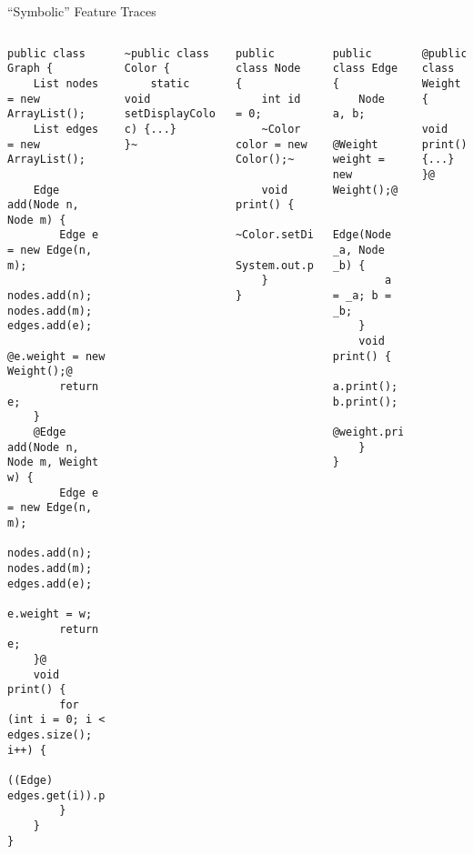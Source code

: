 \begin{frame}[fragile]{``Symbolic'' Feature Traces}
	\begin{tiny}
		\begin{columns}
\begin{lstlisting}
public class Graph {
	List nodes = new ArrayList();
	List edges = new ArrayList();

	Edge add(Node n, Node m) {
		Edge e = new Edge(n, m);
		nodes.add(n); nodes.add(m); edges.add(e);
		@e.weight = new Weight();@
		return e;
	}
	@Edge add(Node n, Node m, Weight w) {
		Edge e = new Edge(n, m);
		nodes.add(n); nodes.add(m); edges.add(e);
		e.weight = w;
		return e;
	}@
	void print() {
		for (int i = 0; i < edges.size(); i++) {
			((Edge) edges.get(i)).print();
		}
	}
}
\end{lstlisting}
\begin{lstlisting}
~public class Color {
	static void setDisplayColor(Color c) {...}
}~
\end{lstlisting}	
\begin{lstlisting}
public class Node {
	int id = 0;
	~Color color = new Color();~

	void print() {
		~Color.setDisplayColor(color);~
		System.out.print(id);
	}
}
\end{lstlisting}
\begin{lstlisting}
public class Edge {
	Node a, b;
	@Weight weight = new Weight();@

	Edge(Node _a, Node _b) {
		a = _a; b = _b;
	}
	void print() {
		a.print(); b.print();
		@weight.print();@
	}
}
\end{lstlisting}
\begin{lstlisting}
@public class Weight {
	void print() {...}
}@
\end{lstlisting}
		\end{columns}
	\end{tiny}
\end{frame}

